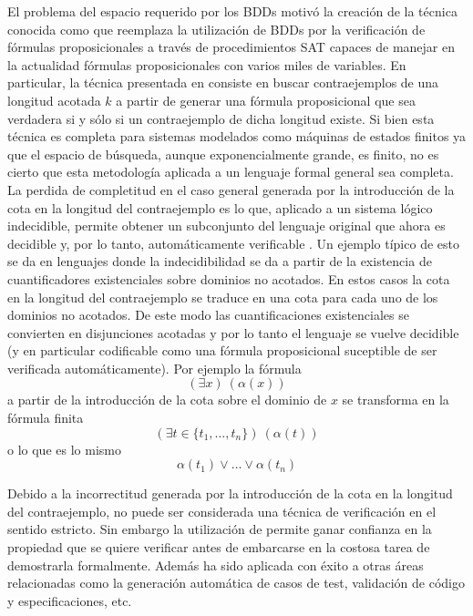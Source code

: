 El problema del espacio requerido por los BDDs motivó la creación de la
técnica conocida como \bmc\cite{Biere:1999:SMC:646483.691738} que reemplaza la
utilización de BDDs por la verificación de fórmulas proposicionales a través
de procedimientos SAT capaces de manejar en la actualidad fórmulas
proposicionales con varios miles de variables. En particular, la técnica
presentada en \cite{Biere:1999:SMC:646483.691738} consiste en buscar
contraejemplos de una longitud acotada $k$ a partir de generar una fórmula
proposicional que sea verdadera si y sólo si un contraejemplo de dicha
longitud existe. Si bien esta técnica es completa para sistemas modelados como
máquinas de estados finitos ya que el espacio de búsqueda, aunque
exponencialmente grande, es finito, no es cierto que esta metodología aplicada
a un lenguaje formal general sea completa. La perdida de
completitud en el caso general generada por la introducción de la cota en la
longitud del contraejemplo es lo que, aplicado a un sistema lógico
indecidible, permite obtener un subconjunto del lenguaje original que ahora es
decidible y, por lo tanto, automáticamente verificable . Un
ejemplo típico de esto se da en lenguajes donde la indecidibilidad se da a
partir de la existencia de cuantificadores existenciales sobre dominios no
acotados. En estos casos la cota en la longitud del contraejemplo se traduce
en una cota para cada uno de los dominios no acotados. De este modo las
cuantificaciones existenciales se convierten en disjunciones acotadas y por lo
tanto el lenguaje se vuelve decidible (y en particular codificable como una
fórmula proposicional suceptible de ser verificada automáticamente). Por
ejemplo la fórmula \begin{equation}(\exists x)\ (\alpha(x))\end{equation} a
partir de la introducción de la cota sobre el dominio de $x$ se transforma en
la fórmula finita \begin{equation}\left(\exists t \in
\{t_1,\ldots,t_n\}\right)\ \left(\alpha(t)\right)\end{equation} o lo que es lo
mismo \begin{equation} \alpha(t_1) \vee \ldots \vee \alpha(t_n)\end{equation}

Debido a la incorrectitud generada por la introducción de la cota en la
longitud del contraejemplo, \bmc no puede ser considerada una técnica de
verificación en el sentido estricto. Sin embargo la utilización de \bmc
permite ganar confianza en la propiedad que se quiere verificar antes de
embarcarse en la costosa tarea de demostrarla formalmente. Además \bmc ha sido
aplicada con éxito a otras áreas relacionadas como la generación automática de
casos de test, validación de código y especificaciones, etc.


